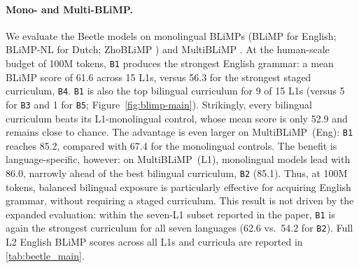 \documentclass[11pt]{article}
\newcommand{\beetle}{Beetle} %
\begin{document}



\paragraph{Mono- and Multi-BLiMP.} 
We evaluate the \beetle{} models on monolingual BLiMPs (BLiMP \citep{warstadt2020blimp} for English; BLiMP-NL \citep{suijkerbuijk2025blimp} for Dutch; ZhoBLiMP \citep{liu-etal-2025-zhoblimp}) and MultiBLiMP \citep{jumelet2025multiblimp}.
At the human-scale budget of 100M tokens, \texttt{B1} produces the strongest English grammar: a mean BLiMP score of 61.6 across 15 L1s, versus 56.3 for the strongest staged curriculum, \texttt{B4}. \texttt{B1} is also the top bilingual curriculum for 9 of 15 L1s (versus 5 for \texttt{B3} and 1 for \texttt{B5}; Figure~\ref{fig:blimp-main}). Strikingly, every bilingual curriculum beats its L1-monolingual control, whose mean score is only 52.9 and remains close to chance. The advantage is even larger on MultiBLiMP~(Eng): \texttt{B1} reaches 85.2, compared with 67.4 for the monolingual controls. The benefit is language-specific, however: on MultiBLiMP~(L1), monolingual models lead with 86.0, narrowly ahead of the best bilingual curriculum, \texttt{B2} (85.1). Thus, at 100M tokens, balanced bilingual exposure is particularly effective for acquiring English grammar, without requiring a staged curriculum. This result is not driven by the expanded evaluation: within the seven-L1 subset reported in the paper, \texttt{B1} is again the strongest curriculum for all seven languages (62.6 vs.\ 54.2 for \texttt{B2}).
Full L2 English BLiMP scores across all L1s and curricula are reported in \autoref{tab:beetle_main}.%
\end{document}
